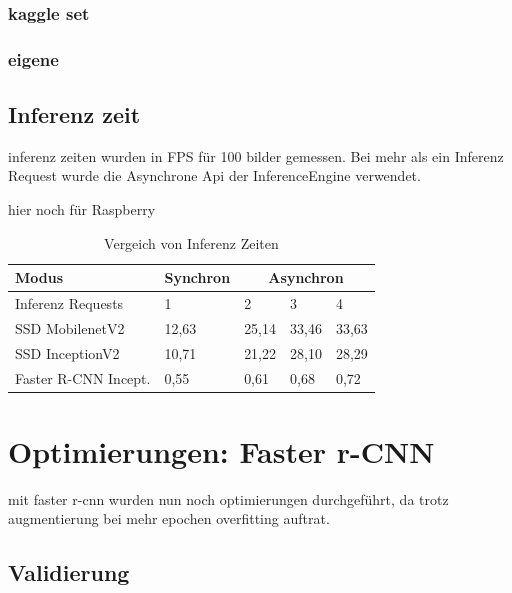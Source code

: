 \subsubsection{kaggle set}
\subsubsection{eigene}


\subsection{Inferenz zeit}

inferenz zeiten wurden in FPS für 100 bilder gemessen. Bei 
mehr als ein Inferenz Request wurde die Asynchrone Api der InferenceEngine 
verwendet.

hier noch für Raspberry


\begin{table}[htb]
  \centering
  \label{table:infer_zeit}
  \begin{tabular}{m{}|m{}<{\centering}|m{}<{\centering}|m{}<{\centering}|m{}<{\centering}}
  \hline
  Modus                & Synchron & \multicolumn{3}{c}{Asynchron} \\ \hline
  Inferenz Requests    & 1        & 2        & 3        & 4        \\ \hline\hline
  SSD MobilenetV2      & 12,63    & 25,14    & 33,46    & 33,63    \\
  SSD InceptionV2      & 10,71    & 21,22    & 28,10    & 28,29    \\
  Faster R-CNN Incept. & 0,55     & 0,61     & 0,68     & 0,72     \\ \hline
  \end{tabular}
  \caption{Vergeich von Inferenz Zeiten}
\end{table}


\section{Optimierungen: Faster r-CNN}
mit faster r-cnn wurden nun noch optimierungen durchgeführt, da 
trotz augmentierung bei mehr epochen overfitting auftrat.


\subsection{Validierung}

